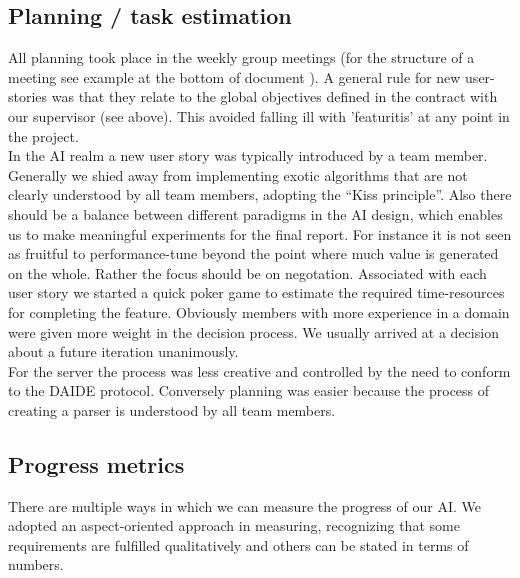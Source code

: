 \documentclass[11pt]{article} \usepackage{fullpage} \usepackage{cite}
\begin{document}
\subsection{Planning / task estimation}
All planning took place in the weekly group meetings (for the structure of a
meeting see example at the bottom of document ). A general rule for new
user-stories was that they relate to the global objectives defined in the
contract with our supervisor (see above). This avoided falling ill with
'featuritis' at any point in the project.  \\ In the AI realm a new user story
was typically introduced by a team member. Generally we shied away from
implementing exotic algorithms that are not clearly understood by all team
members, adopting the ``Kiss principle''. Also there should be a balance between
different paradigms in the AI design, which enables us to make meaningful
experiments for the final report. For instance it is not seen as fruitful to
performance-tune beyond the point where much value is generated on the
whole. Rather the focus should be on negotation. Associated with each user story
we started a quick poker game to estimate the required time-resources for
completing the feature. Obviously members with more experience in a domain were
given more weight in the decision process.  We usually arrived at a decision
about a future iteration unanimously.  \\ For the server the process was less
creative and controlled by the need to conform to the DAIDE protocol. Conversely
planning was easier because the process of creating a parser is understood by
all team members.

\subsection{Progress metrics}
There are multiple ways in which we can measure the progress of our AI.  We
adopted an aspect-oriented approach in measuring, recognizing that some
requirements are fulfilled qualitatively and others can be stated in terms of
numbers.
\end{document}
